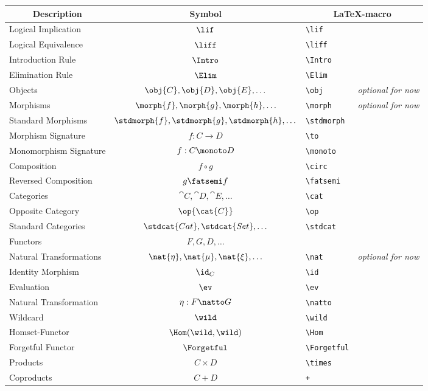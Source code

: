 \documentclass{standalone}
\begin{document}
\begin{longtable}[c]{lcll}
  \hline
  \multicolumn{1}{c}{\textbf{Description}} & 
  \multicolumn{1}{c}{\textbf{Symbol}} &
  \multicolumn{2}{c}{\textbf{\LaTeX-macro}} \\
  \hline
  Logical Implication & $\lif$ & \verb|\lif| \\
  Logical Equivalence & $\liff$ & \verb|\liff| \\
  Introduction Rule & $\Intro$ & \verb|\Intro| \\
  Elimination Rule & $\Elim$ & \verb|\Elim| \\
  \hline
  Objects & $\obj{C},\obj{D},\obj{E},\ldots$ & \verb|\obj| & \emph{optional for now} \\
  Morphisms & $\morph{f}, \morph{g}, \morph{h}, \ldots$ & \verb|\morph| & \emph{optional for now} \\
  Standard Morphisms & $\stdmorph{f}, \stdmorph{g}, \stdmorph{h}, \ldots$ & \verb|\stdmorph| \\
  Morphism Signature & $f:C \to D$ & \verb|\to| \\
  Monomorphism Signature & $f: C \monoto D$ & \verb|\monoto| \\
  Composition & $f \circ g$ & \verb|\circ| \\
  Reversed Composition & $g \fatsemi f$ & \verb|\fatsemi| \\
  Categories & $\cat{C},\cat{D},\cat{E},\ldots$ & \verb|\cat| \\
  Opposite Category & $\op{\cat{C}}$ & \verb|\op| \\
  Standard Categories & $\stdcat{Cat}, \stdcat{Set}, \ldots$ & \verb|\stdcat| \\
  Functors & $F,G,D,\ldots$ & \\
  Natural Transformations & $\nat{\eta}, \nat{\mu}, \nat{\xi}, \ldots$ & \verb|\nat| &
  \emph{optional for now} \\
  Identity Morphism & $\id_C$ & \verb|\id| \\
  Evaluation & $\ev$ & \verb|\ev| \\
  Natural Transformation & $\eta : F \natto G$ & \verb|\natto| \\
  Wildcard & $\wild$ & \verb|\wild| \\
  Homset-Functor & $\Hom(\wild,\wild)$ & \verb|\Hom| \\
  Forgetful Functor & $\Forgetful$ & \verb|\Forgetful| \\
  \hline
  Products & $C \times D$ & \verb|\times| \\
  Coproducts & $C + D$ & \verb|+| \\

\end{longtable}
\end{document}
